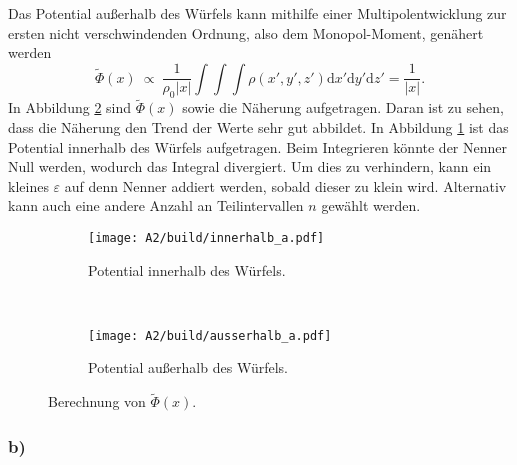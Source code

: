 Das Potential außerhalb des Würfels kann mithilfe einer Multipolentwicklung zur ersten nicht verschwindenden Ordnung, also dem Monopol-Moment, genähert werden
\begin{equation*}
  \tilde{\Phi}(x) \: \propto \: \frac{1}{\rho_0 |x|} \int \int \int \rho(x', y', z') \mathrm{d}x'\mathrm{d}y'\mathrm{d}z' = \frac{1}{|x|}.
\end{equation*}
In Abbildung \ref{fig:aus_a} sind \(\tilde{\Phi}(x)\) sowie die Näherung aufgetragen. Daran ist zu sehen, dass die Näherung den Trend der Werte sehr gut abbildet.
In Abbildung \ref{fig:inn_a} ist das Potential innerhalb des Würfels aufgetragen.
Beim Integrieren könnte der Nenner Null werden, wodurch das Integral divergiert. Um dies zu verhindern, kann ein kleines \(\varepsilon\) auf denn Nenner addiert werden, sobald dieser zu klein wird. Alternativ kann auch eine andere Anzahl an Teilintervallen \(n\) gewählt werden.
\begin{figure}[h!]
  \centering
  \begin{subfigure}[b]{0.45\textwidth}
      \texttt{[image: A2/build/innerhalb\_a.pdf]}
      \caption{Potential innerhalb des Würfels.}
      \label{fig:inn_a}
    \end{subfigure}
    ~ %
    \begin{subfigure}[b]{0.45\textwidth}
      \texttt{[image: A2/build/ausserhalb\_a.pdf]}
      \caption{Potential außerhalb des Würfels.}
      \label{fig:aus_a}
    \end{subfigure}
    \caption{Berechnung von \(\tilde{\Phi}(x)\).}\label{fig:a}
\end{figure}
\FloatBarrier
\subsubsection*{b)}

